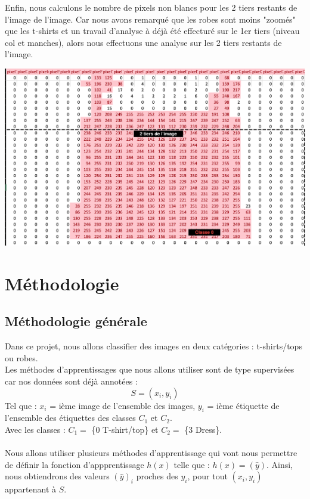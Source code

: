 \documentclass[a4paper,10pt]{article}
\begin{document}
		\begin{minipage}{0.55\linewidth}
			Enfin, nous calculons le nombre de pixels non blancs pour les 2 tiers restants de l'image de l’image. Car nous avons remarqué que les robes sont moins "zoomés" que les t-shirts et un travail d'analyse à déjà été effecturé sur le 1er tiers (niveau col et manches), alors nous effectuons une analyse sur les 2 tiers restants de l'image.
		\end{minipage}\hfill
		\begin{minipage}{0.4\linewidth}
			\includegraphics[scale = 0.10]{fichiers/ex_tshirt.png}	
		\end{minipage}
		


\newpage
\section{Méthodologie}
	\subsection{Méthodologie générale}
		Dans ce projet, nous allons classifier des images en deux catégories : t-shirts/tops ou robes.\\
		Les méthodes d'apprentissages que nous allons utiliser sont de type supervisées car nos données sont déjà annotées :
		$$ S = {(x_i, y_i)} $$
		Tel que : $x_i$ = ième image de l'ensemble des images, $y_i$ = ième étiquette de l'ensemble des étiquettes des classes $C_1$ et $C_2$.\\
		Avec les classes : $C_1 =$ \{0 T-shirt/top\} et $C_2 =$ \{3 Dress\}.\\
		\\
		Nous allons utiliser plusieurs méthodes d’apprentissage qui vont nous permettre de définir la fonction d'appprentissage $h(x)$ telle que : $h(x) = (\hat y)$. Ainsi, nous obtiendrons des valeurs $(\hat y)_i$ proches des $y_i$, pour tout $(x_i, y_i)$ appartenant à $S$.\\
\end{document}

